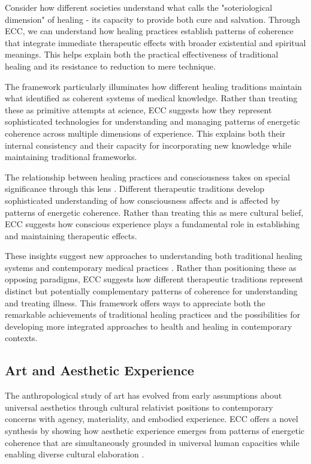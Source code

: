 Consider how different societies understand what \cite{good1994medicine} calls the "soteriological dimension" of healing - its capacity to provide both cure and salvation. Through ECC, we can understand how healing practices establish patterns of coherence that integrate immediate therapeutic effects with broader existential and spiritual meanings. This helps explain both the practical effectiveness of traditional healing and its resistance to reduction to mere technique.

The framework particularly illuminates how different healing traditions maintain what \cite{leslie1976asian} identified as coherent systems of medical knowledge. Rather than treating these as primitive attempts at science, ECC suggests how they represent sophisticated technologies for understanding and managing patterns of energetic coherence across multiple dimensions of experience. This explains both their internal consistency and their capacity for incorporating new knowledge while maintaining traditional frameworks.

The relationship between healing practices and consciousness takes on special significance through this lens \cite{csordas1993somatic}. Different therapeutic traditions develop sophisticated understanding of how consciousness affects and is affected by patterns of energetic coherence. Rather than treating this as mere cultural belief, ECC suggests how conscious experience plays a fundamental role in establishing and maintaining therapeutic effects.

These insights suggest new approaches to understanding both traditional healing systems and contemporary medical practices \cite{kleinman1980patients}. Rather than positioning these as opposing paradigms, ECC suggests how different therapeutic traditions represent distinct but potentially complementary patterns of coherence for understanding and treating illness. This framework offers ways to appreciate both the remarkable achievements of traditional healing practices and the possibilities for developing more integrated approaches to health and healing in contemporary contexts.

\subsection{Art and Aesthetic Experience}

The anthropological study of art has evolved from early assumptions about universal aesthetics through cultural relativist positions to contemporary concerns with agency, materiality, and embodied experience. ECC offers a novel synthesis by showing how aesthetic experience emerges from patterns of energetic coherence that are simultaneously grounded in universal human capacities while enabling diverse cultural elaboration \cite{gell1998art}.

